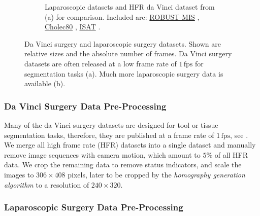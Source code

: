 \begin{figure}
\begin{subfigure}[b]{\textwidth}
    \caption{Laparoscopic datasets and HFR da Vinci dataset from (a) for comparison. Included are: \href{https://robustmis2019.grand-challenge.org/}{ROBUST-MIS} \cite{maier2020heidelberg}, \href{http://camma.u-strasbg.fr/datasets}{Cholec80} \cite{twinanda2016endonet}, \href{https://endovissub-instrument.grand-challenge.org/}{ISAT} \cite{bodenstedt2018comparative}.}
    \label{c3:fig:data_b}
\end{subfigure}    
\caption{Da Vinci surgery and laparoscopic surgery datasets. Shown are relative sizes and the absolute number of frames. Da Vinci surgery datasets are often released at a low frame rate of $1\,\text{fps}$ for segmentation tasks (a). Much more laparoscopic surgery data is available (b).}
\label{c3:fig:data}
\end{figure}

\subsubsection{Da Vinci Surgery Data Pre-Processing}

Many of the da Vinci surgery datasets are designed for tool or tissue segmentation tasks, therefore, they are published at a frame rate of $1\,\text{fps}$, see . We merge all high frame rate (HFR) datasets into a single dataset and manually remove image sequences with camera motion, which amount to $5\%$ of all
HFR data. We crop the remaining data to remove status indicators, and scale the images to $306\times408$ pixels, later to be cropped by the \textit{homography generation algorithm} to a resolution of $240\times320$.

\subsubsection{Laparoscopic Surgery Data Pre-Processing}
\label{c3:sec:lap_pre}

